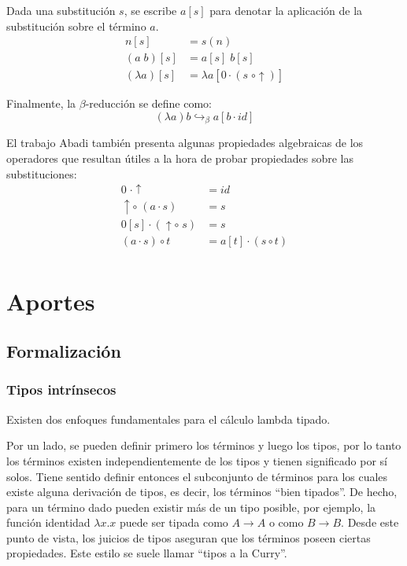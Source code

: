 \documentclass[]{report}
\begin{document}
	Dada una substitución $s$, se escribe $a[s]$ para denotar la aplicación de la substitución sobre el término $a$.
	\begin{align*}
		n[s] &= s(n) \\
		(a\; b)[s] &= a[s]\; b[s] \\
		(\lambda a)[s] &= \lambda a[0 \cdot (s \; \circ \uparrow)]
	\end{align*}
	
	Finalmente, la $\beta$-reducción se define como:
	\[ (\lambda a)b \hookrightarrow_{\beta} a[b \cdot id] \]
	
	El trabajo Abadi también presenta algunas propiedades algebraicas de los operadores que resultan útiles a la hora de probar propiedades sobre las substituciones:
	\begin{align*}
		0 \; \cdot \uparrow &= id \\
		\uparrow \circ\; (a \cdot s) &= s \\
		0[s] \cdot (\uparrow \circ\; s) &= s \\
		(a \cdot s) \circ t &= a[t] \cdot (s \circ t) \\
	\end{align*}
	
	
	\chapter{Aportes}
	\section{Formalización}
	
	
	\subsection{Tipos intrínsecos}
	
	Existen dos enfoques fundamentales para el cálculo lambda tipado.

	Por un lado, se pueden definir primero los términos y luego los tipos, por lo tanto los términos existen independientemente de los tipos y tienen significado por sí solos.
	Tiene sentido definir entonces el subconjunto de términos para los cuales existe alguna derivación de tipos, es decir, los términos ``bien tipados''.
	De hecho, para un término dado pueden existir más de un tipo posible, por ejemplo, la función identidad $\lambda x.x$ puede ser tipada como $A \rightarrow A$ o como $B \rightarrow B$.
	Desde este punto de vista, los juicios de tipos aseguran que los términos poseen ciertas propiedades.
	Este estilo se suele llamar ``tipos a la Curry''.
	
\end{document}
